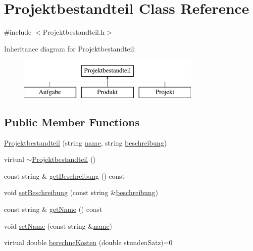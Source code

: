 \hypertarget{classProjektbestandteil}{}\section{Projektbestandteil Class Reference}
\label{classProjektbestandteil}


{\ttfamily \#include $<$Projektbestandteil.\+h$>$}

Inheritance diagram for Projektbestandteil\+:\begin{figure}[H]
\begin{center}
\leavevmode
\includegraphics[height=2.000000cm]{classProjektbestandteil}
\end{center}
\end{figure}
\subsection*{Public Member Functions}
\begin{DoxyCompactItemize}
\item 
\hyperlink{classProjektbestandteil_ab7d77a751f69692590b5ad37445f1299}{Projektbestandteil} (string \hyperlink{classProjektbestandteil_a3592f75d5870371bd87c9a057f31241e}{name}, string \hyperlink{classProjektbestandteil_a68c5cc53ee0c402c82e333493f460ecb}{beschreibung})
\item 
virtual \hyperlink{classProjektbestandteil_a27f6a84885c2b783309403e5cf579ef1}{$\sim$\+Projektbestandteil} ()
\item 
const string \& \hyperlink{classProjektbestandteil_ac57329c90bc680e5bdc19bf8b66df5ed}{get\+Beschreibung} () const 
\item 
void \hyperlink{classProjektbestandteil_a317d5cd613fc5e62d2858d36f868de3b}{set\+Beschreibung} (const string \&\hyperlink{classProjektbestandteil_a68c5cc53ee0c402c82e333493f460ecb}{beschreibung})
\item 
const string \& \hyperlink{classProjektbestandteil_aeabecfd2533b8192fd07f596b2e426d0}{get\+Name} () const 
\item 
void \hyperlink{classProjektbestandteil_a9f11066ffbdcdad737a5cf2035392771}{set\+Name} (const string \&\hyperlink{classProjektbestandteil_a3592f75d5870371bd87c9a057f31241e}{name})
\item 
virtual double \hyperlink{classProjektbestandteil_acfbc3a13db3a04de51ec9578436b4736}{berechne\+Kosten} (double stunden\+Satz)=0
\end{DoxyCompactItemize}
